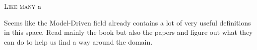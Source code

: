\documentclass{book}
\begin{document}
\lettrine{L}{ike many} a

Seems like the Model-Driven field already contains a lot of very
useful definitions in this space. Read mainly the book but also the
papers and figure out what they can do to help us find a way around
the domain.



\end{document}

